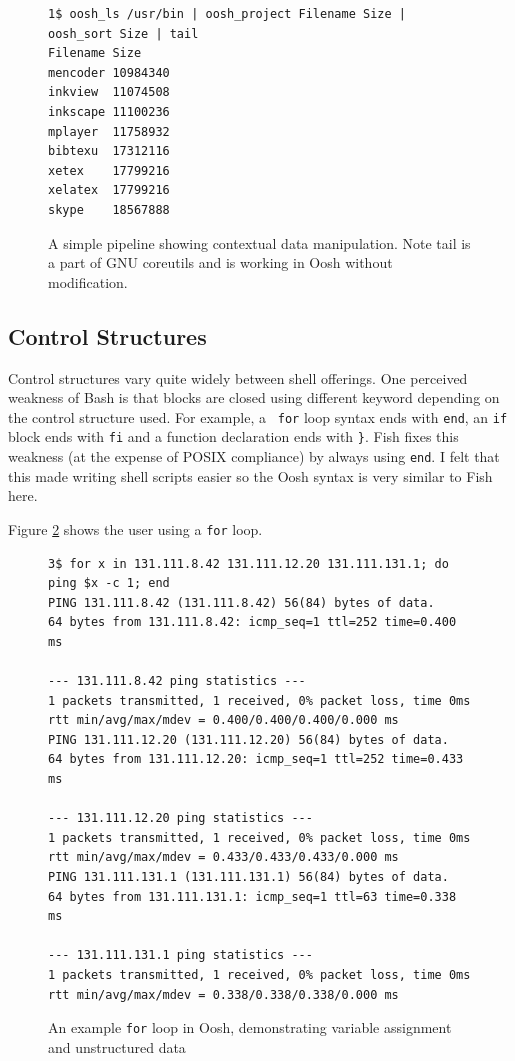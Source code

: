 \documentclass[12pt,twoside,notitlepage]{report}
\begin{document}
\begin{figure}
\label{lsexample}
\caption{A simple pipeline showing contextual data manipulation. Note tail is a part of
GNU coreutils and is working in Oosh without modification.}
\begin{verbatim}
1$ oosh_ls /usr/bin | oosh_project Filename Size | oosh_sort Size | tail
Filename Size
mencoder 10984340
inkview  11074508
inkscape 11100236
mplayer  11758932
bibtexu  17312116
xetex    17799216
xelatex  17799216
skype    18567888
\end{verbatim}
\end{figure}

\subsection{Control Structures}
\label{forexample}

Control structures vary quite widely between shell offerings. One
perceived weakness of Bash is that blocks are closed using different
keyword depending on the control structure used. For example, a {\tt
  for} loop syntax ends with {\tt end}, an {\tt if} block ends with
{\tt fi} and a function declaration ends with {\tt \}}. Fish fixes
this weakness (at the expense of POSIX compliance) by always using
{\tt end}. I felt that this made writing shell scripts easier so the
Oosh syntax is very similar to Fish here.

Figure \ref{forloop} shows the user using a {\tt for} loop.

\begin{figure}
\label{forloop}
\caption{An example {\tt for} loop in Oosh, demonstrating variable
  assignment and unstructured data}
\begin{verbatim}
3$ for x in 131.111.8.42 131.111.12.20 131.111.131.1; do ping $x -c 1; end
PING 131.111.8.42 (131.111.8.42) 56(84) bytes of data.
64 bytes from 131.111.8.42: icmp_seq=1 ttl=252 time=0.400 ms

--- 131.111.8.42 ping statistics ---
1 packets transmitted, 1 received, 0% packet loss, time 0ms
rtt min/avg/max/mdev = 0.400/0.400/0.400/0.000 ms
PING 131.111.12.20 (131.111.12.20) 56(84) bytes of data.
64 bytes from 131.111.12.20: icmp_seq=1 ttl=252 time=0.433 ms

--- 131.111.12.20 ping statistics ---
1 packets transmitted, 1 received, 0% packet loss, time 0ms
rtt min/avg/max/mdev = 0.433/0.433/0.433/0.000 ms
PING 131.111.131.1 (131.111.131.1) 56(84) bytes of data.
64 bytes from 131.111.131.1: icmp_seq=1 ttl=63 time=0.338 ms

--- 131.111.131.1 ping statistics ---
1 packets transmitted, 1 received, 0% packet loss, time 0ms
rtt min/avg/max/mdev = 0.338/0.338/0.338/0.000 ms
\end{verbatim}
\end{figure}
\end{document}
